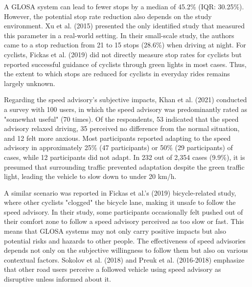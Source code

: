A GLOSA system can lead to fewer stops by a median of 45.2\% (IQR: 30.25\%). However, the potential stop rate reduction also depends on the study environment. Xu et al. (2015) \cite{xu_bb_2015} presented the only identified study that measured this parameter in a real-world setting. In their small-scale study, the authors came to a stop reduction from 21 to 15 stops (28.6\%) when driving at night. For cyclists, Fickas et al. (2019) \cite{fickas_fast_2019} did not directly measure stop rates for cyclists but reported successful guidance of cyclists through green lights in most cases. Thus, the extent to which stops are reduced for cyclists in everyday rides remains largely unknown.

Regarding the speed advisory's subjective impacts, Khan et al. (2021) \cite{khan_eco-drive_2021} conducted a survey with 100 users, in which the speed advisory was predominantly rated as "somewhat useful" (70 times). Of the respondents, 53 indicated that the speed advisory relaxed driving, 35 perceived no difference from the normal situation, and 12 felt more anxious. Most participants reported adapting to the speed advisory in approximately 25\% (47 participants) or 50\% (29 participants) of cases, while 12 participants did not adapt. In 232 out of 2,354 cases (9.9\%), it is presumed that surrounding traffic prevented adaptation despite the green traffic light, leading the vehicle to slow down to under 20 km/h. 

A similar scenario was reported in Fickas et al.'s (2019) \cite{fickas_fast_2019} bicycle-related study, where other cyclists "clogged" the bicycle lane, making it unsafe to follow the speed advisory. In their study, some participants occasionally felt pushed out of their comfort zone to follow a speed advisory perceived as too slow or fast. This means that GLOSA systems may not only carry positive impacts but also potential risks and hazards to other people. The effectiveness of speed advisories depends not only on the subjective willingness to follow them but also on various contextual factors. Sokolov et al. (2018) \cite{sokolov_effects_2018} and Preuk et al. (2016-2018) \cite{preuk_does_2016, preuk_should_2018} emphasize that other road users perceive a followed vehicle using speed advisory as disruptive unless informed about it.


